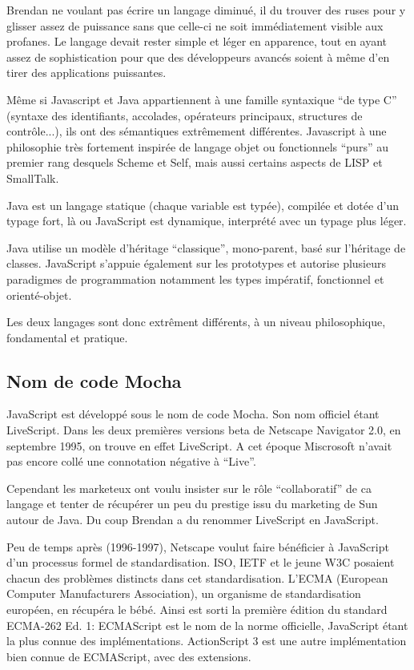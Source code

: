 Brendan ne voulant pas écrire un langage diminué, il du trouver des ruses pour y glisser assez de puissance sans que celle-ci ne soit immédiatement visible aux profanes. Le langage devait rester simple et léger en apparence, tout en ayant assez de sophistication pour que des développeurs avancés soient à même d’en tirer des applications puissantes.

Même si Javascript et Java appartiennent à une famille syntaxique “de type C” (syntaxe des identifiants, accolades, opérateurs principaux, structures de contrôle...), ils ont des sémantiques extrêmement différentes. Javascript à une philosophie très fortement inspirée de langage objet ou fonctionnels “purs” au premier rang desquels Scheme et Self, mais aussi certains aspects de LISP et SmallTalk.

Java est un langage statique (chaque variable est typée), compilée et dotée d’un typage fort, là ou JavaScript est dynamique, interprété avec un typage plus léger.

Java utilise un modèle d’héritage “classique”, mono-parent, basé sur l’héritage de classes. JavaScript s'appuie également sur les prototypes et autorise plusieurs paradigmes de programmation notamment les types impératif, fonctionnel et orienté-objet.

Les deux langages sont donc extrêment différents, à un niveau philosophique, fondamental et pratique.

\subsection{Nom de code Mocha}

JavaScript est développé sous le nom de code Mocha. Son nom officiel étant LiveScript. Dans les deux premières versions beta de Netscape Navigator 2.0, en septembre 1995, on trouve en effet LiveScript. A cet époque Miscrosoft n’avait pas encore collé une connotation négative à “Live”.

Cependant les marketeux ont voulu insister sur le rôle “collaboratif” de ca langage et tenter de récupérer un peu du prestige issu du marketing de Sun autour de Java. Du coup Brendan a du renommer LiveScript en JavaScript.

Peu de temps après (1996-1997), Netscape voulut faire bénéficier à JavaScript d’un processus formel de standardisation. ISO, IETF et le jeune W3C posaient chacun des problèmes distincts dans cet standardisation. L’ECMA (European Computer Manufacturers Association), un organisme de standardisation européen, en récupéra le bébé. Ainsi est sorti la première édition du standard ECMA-262 Ed. 1: ECMAScript est le nom de la norme officielle, JavaScript étant la plus connue des implémentations. ActionScript 3 est une autre implémentation bien connue de ECMAScript, avec des extensions.


